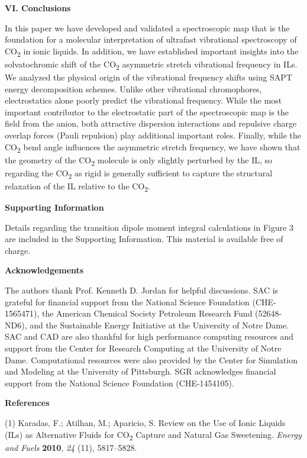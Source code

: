 \documentclass[]{article}
\begin{document}
\textbf{VI. Conclusions}

In this paper we have developed and validated a spectroscopic map that
is the foundation for a molecular interpretation of ultrafast
vibrational spectroscopy of CO\textsubscript{2} in ionic liquids. In
addition, we have established important insights into the solvatochromic
shift of the CO\textsubscript{2} asymmetric stretch vibrational
frequency in ILs. We analyzed the physical origin of the vibrational
frequency shifts using SAPT energy decomposition schemes. Unlike other
vibrational chromophores, electrostatics alone poorly predict the
vibrational frequency. While the most important contributor to the
electrostatic part of the spectroscopic map is the field from the anion,
both attractive dispersion interactions and repulsive charge overlap
forces (Pauli repulsion) play additional important roles. Finally, while
the CO\textsubscript{2} bend angle influences the asymmetric stretch
frequency, we have shown that the geometry of the CO\textsubscript{2}
molecule is only slightly perturbed by the IL, so regarding the
CO\textsubscript{2} as rigid is generally sufficient to capture the
structural relaxation of the IL relative to the CO\textsubscript{2}.

\textbf{Supporting Information}

Details regarding the transition dipole moment integral calculations in
Figure 3 are included in the Supporting Information. This material is
available free of charge.

\textbf{Acknowledgements}

The authors thank Prof. Kenneth D. Jordan for helpful discussions. SAC
is grateful for financial support from the National Science Foundation
(CHE-1565471), the American Chemical Society Petroleum Research Fund
(52648-ND6), and the Sustainable Energy Initiative at the University of
Notre Dame. SAC and CAD are also thankful for high performance computing
resources and support from the Center for Research Computing at the
University of Notre Dame. Computational resources were also provided by
the Center for Simulation and Modeling at the University of Pittsburgh.
SGR acknowledges financial support from the National Science Foundation
(CHE-1454105).

\textbf{References}

(1) Karadas, F.; Atilhan, M.; Aparicio, S. Review on the Use of Ionic
Liquids (ILs) as Alternative Fluids for CO\textsubscript{2} Capture and
Natural Gas Sweetening. \emph{Energy and Fuels} \textbf{2010}, \emph{24}
(11), 5817--5828.
\end{document}
